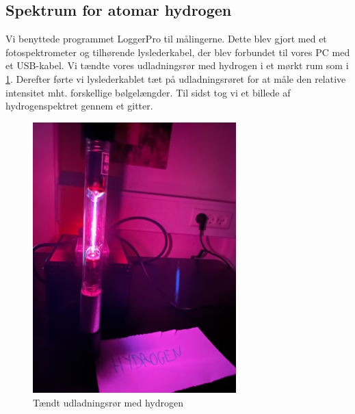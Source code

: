 \documentclass[11pt]{article}
\theoremstyle{definition}
\begin{document}
\subsection{Spektrum for atomar hydrogen}
Vi benyttede programmet LoggerPro til målingerne.
Dette blev gjort med et fotospektrometer og tilhørende lyslederkabel, der blev forbundet til vores PC med et USB-kabel.
Vi tændte vores udladningsrør med hydrogen i et mørkt rum som i \cref{fig:hydrogen}.
Derefter førte vi lyslederkablet tæt på udladningsrøret for at måle den relative intensitet mht. forskellige bølgelængder.
Til sidst tog vi et billede af hydrogenspektret gennem et gitter.
\begin{figure}[H]
\begin{center}
  \includegraphics[width=0.7\textwidth]{hydrogen.jpeg}
\end{center}
\caption{Tændt udladningsrør med hydrogen}
\label{fig:hydrogen}
\end{figure}
\end{document}
